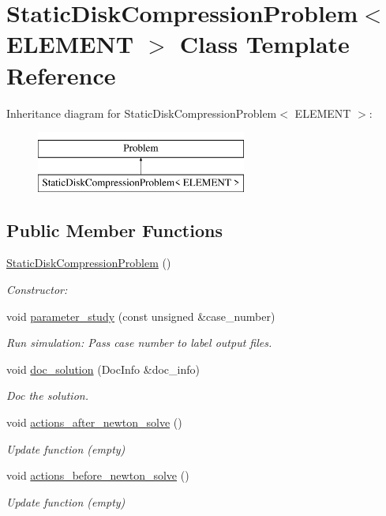 \hypertarget{classStaticDiskCompressionProblem}{}\section{Static\+Disk\+Compression\+Problem$<$ E\+L\+E\+M\+E\+NT $>$ Class Template Reference}
\label{classStaticDiskCompressionProblem}
Inheritance diagram for Static\+Disk\+Compression\+Problem$<$ E\+L\+E\+M\+E\+NT $>$\+:\begin{figure}[H]
\begin{center}
\leavevmode
\includegraphics[height=2.000000cm]{classStaticDiskCompressionProblem}
\end{center}
\end{figure}
\subsection*{Public Member Functions}
\begin{DoxyCompactItemize}
\item 
\hyperlink{classStaticDiskCompressionProblem_a462e81aec225a5d6204b579719b3db87}{Static\+Disk\+Compression\+Problem} ()
\begin{DoxyCompactList}\small\item\em Constructor\+: \end{DoxyCompactList}\item 
void \hyperlink{classStaticDiskCompressionProblem_ac64db4786efde78e70b1110422331b02}{parameter\+\_\+study} (const unsigned \&case\+\_\+number)
\begin{DoxyCompactList}\small\item\em Run simulation\+: Pass case number to label output files. \end{DoxyCompactList}\item 
void \hyperlink{classStaticDiskCompressionProblem_a9154152d022e86461966b5562f5acba4}{doc\+\_\+solution} (Doc\+Info \&doc\+\_\+info)
\begin{DoxyCompactList}\small\item\em Doc the solution. \end{DoxyCompactList}\item 
void \hyperlink{classStaticDiskCompressionProblem_a484b47d6a10a91cbd30cb807a49b1f58}{actions\+\_\+after\+\_\+newton\+\_\+solve} ()
\begin{DoxyCompactList}\small\item\em Update function (empty) \end{DoxyCompactList}\item 
void \hyperlink{classStaticDiskCompressionProblem_a2b00608d2992b40217248e01b2294153}{actions\+\_\+before\+\_\+newton\+\_\+solve} ()
\begin{DoxyCompactList}\small\item\em Update function (empty) \end{DoxyCompactList}\end{DoxyCompactItemize}
